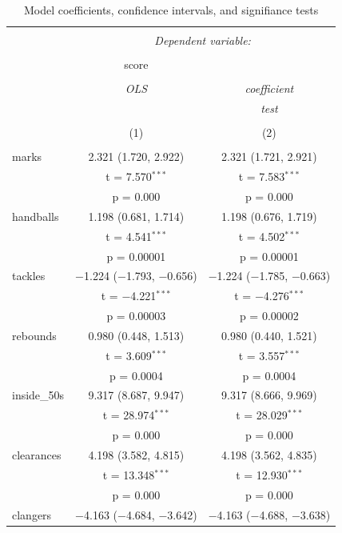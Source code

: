 \documentclass{article}
\begin{document}
\begin{table}[!htbp] \centering 
  \caption{Model coefficients, confidence intervals, and signifiance tests} 
  \label{tab:coeftable} 
\begin{tabular}{@{\extracolsep{5pt}}lcc} 
\\[-1.8ex]\hline 
\hline \\[-1.8ex] 
 & \multicolumn{2}{c}{\textit{Dependent variable:}} \\ 
\cline{2-3} 
\\[-1.8ex] & score &   \\ 
\\[-1.8ex] & \textit{OLS} & \textit{coefficient} \\ 
 & \textit{} & \textit{test} \\ 
\\[-1.8ex] & (1) & (2)\\ 
\hline \\[-1.8ex] 
 marks & 2.321 (1.720, 2.922) & 2.321 (1.721, 2.921) \\ 
  & t = 7.570$^{***}$ & t = 7.583$^{***}$ \\ 
  & p = 0.000 & p = 0.000 \\ 
  handballs & 1.198 (0.681, 1.714) & 1.198 (0.676, 1.719) \\ 
  & t = 4.541$^{***}$ & t = 4.502$^{***}$ \\ 
  & p = 0.00001 & p = 0.00001 \\ 
  tackles & $-$1.224 ($-$1.793, $-$0.656) & $-$1.224 ($-$1.785, $-$0.663) \\ 
  & t = $-$4.221$^{***}$ & t = $-$4.276$^{***}$ \\ 
  & p = 0.00003 & p = 0.00002 \\ 
  rebounds & 0.980 (0.448, 1.513) & 0.980 (0.440, 1.521) \\ 
  & t = 3.609$^{***}$ & t = 3.557$^{***}$ \\ 
  & p = 0.0004 & p = 0.0004 \\ 
  inside\_50s & 9.317 (8.687, 9.947) & 9.317 (8.666, 9.969) \\ 
  & t = 28.974$^{***}$ & t = 28.029$^{***}$ \\ 
  & p = 0.000 & p = 0.000 \\ 
  clearances & 4.198 (3.582, 4.815) & 4.198 (3.562, 4.835) \\ 
  & t = 13.348$^{***}$ & t = 12.930$^{***}$ \\ 
  & p = 0.000 & p = 0.000 \\ 
  clangers & $-$4.163 ($-$4.684, $-$3.642) & $-$4.163 ($-$4.688, $-$3.638) \\ 

\end{tabular}
\end{table}
\end{document}
